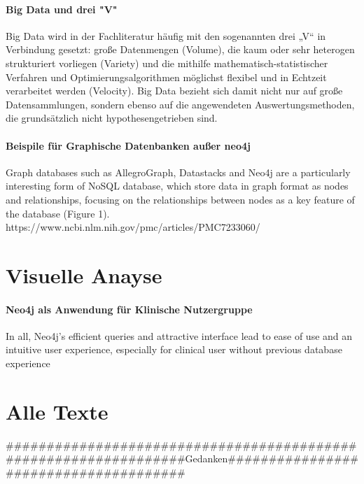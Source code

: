 
\paragraph{Big Data und drei "V"}
Big Data wird in der Fachliteratur häufig mit den sogenannten drei „V“ in Verbindung gesetzt: große Datenmengen (Volume), die kaum oder sehr heterogen strukturiert vorliegen (Variety) und die mithilfe mathematisch-statistischer Verfahren und Optimierungsalgorithmen möglichst flexibel und in Echtzeit verarbeitet werden (Velocity). Big Data bezieht sich damit nicht nur auf große Datensammlungen, sondern ebenso auf die angewendeten Auswertungsmethoden, die grundsätzlich nicht hypothesengetrieben sind. 

\paragraph{Beispile für Graphische Datenbanken außer neo4j}
Graph databases such as AllegroGraph, Datastacks and Neo4j are a particularly interesting form of NoSQL database, which store data in graph format as nodes and relationships, focusing on the relationships between nodes as a key feature of the database (Figure 1). 
https://www.ncbi.nlm.nih.gov/pmc/articles/PMC7233060/




\section{Visuelle Anayse}
\paragraph{Neo4j als Anwendung für Klinische Nutzergruppe}
In all, Neo4j’s efficient queries and attractive interface lead to ease of use and an intuitive user experience, especially for clinical user without previous database experience

\section{Alle Texte}
#################################################################Gedanken######################################

